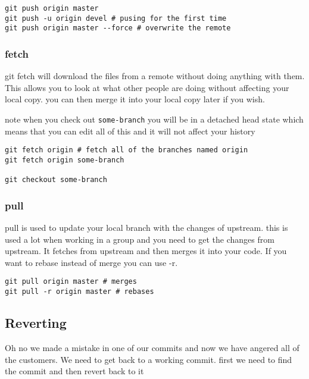 \documentclass[a4paper]{article}
\begin{document}
\begin{verbatim}
git push origin master
git push -u origin devel # pusing for the first time
git push origin master --force # overwrite the remote
\end{verbatim}

\subsubsection*{fetch}
\label{sec:orgca3483c}
\begin{notes}
	git fetch will download the files from a remote without doing anything with
	them. This allows you to look at what other people are doing without
	affecting your local copy. you can then merge it into your local copy later if
	you wish.

	note when you check out \texttt{some-branch} you will be in a detached head state which
	means that you can edit all of this and it will not affect your history
\end{notes}

\begin{verbatim}
git fetch origin # fetch all of the branches named origin
git fetch origin some-branch

git checkout some-branch
\end{verbatim}
\subsubsection*{pull}
\label{sec:org0dc8f2a}
\begin{notes}
	pull is used to update your local branch with the changes of upstream. this is
	used a lot when working in a group and you need to get the changes from
	upstream. It fetches from upstream and then merges it into your code. If you
	want to rebase instead of merge you can use -r.
\end{notes}

\begin{verbatim}
git pull origin master # merges
git pull -r origin master # rebases
\end{verbatim}

\subsection*{Reverting}
\label{sec:orgc113ac0}
\begin{notes}
	Oh no we made a mistake in one of our commits and now we have angered all of the
	customers. We need to get back to a working commit. first we need to find the
	commit and then revert back to it
\end{notes}
\end{document}
